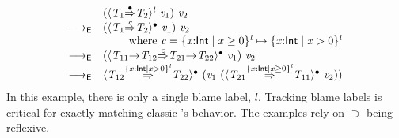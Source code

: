 \documentclass[9pt]{extarticle}
\newcommand{\ottnt}[1]{\mathit{#1}}
\newcommand{\ottsym}[1]{#1}
\begin{document}
\[ \begin{array}{rl} 
           &   (  \langle  \ottnt{T_{{\mathrm{1}}}}  \mathord{ \overset{\bullet}{\Rightarrow} }  \ottnt{T_{{\mathrm{2}}}}  \rangle^{ \ottnt{l} } ~  \mathit{v_{{\mathrm{1}}}}  )  ~ \mathit{v_{{\mathrm{2}}}}  \\
   \longrightarrow _{  \mathsf{E}  }  &   (  \langle  \ottnt{T_{{\mathrm{1}}}}  \mathord{ \overset{ \ottnt{c} }{\Rightarrow} }  \ottnt{T_{{\mathrm{2}}}}  \rangle^{\bullet} ~  \mathit{v_{{\mathrm{1}}}}  )  ~ \mathit{v_{{\mathrm{2}}}}  \\
  \multicolumn{2}{r}{\text{where } \ottnt{c}  \ottsym{=}   \{ \mathit{x} \mathord{:}  \mathsf{Int}  \mathrel{\mid}  \mathit{x}  \mathrel{\ge}  \ottsym{0}  \}^{ \ottnt{l} }   \mapsto   \{ \mathit{x} \mathord{:}  \mathsf{Int}  \mathrel{\mid}  \mathit{x}  \mathrel{>} \ottsym{0}  \}^{ \ottnt{l} } } \\
   \longrightarrow _{  \mathsf{E}  }  &   (  \langle   \ottnt{T_{{\mathrm{11}}}} \mathord{ \rightarrow } \ottnt{T_{{\mathrm{12}}}}   \mathord{ \overset{ \ottnt{c} }{\Rightarrow} }   \ottnt{T_{{\mathrm{21}}}} \mathord{ \rightarrow } \ottnt{T_{{\mathrm{22}}}}   \rangle^{\bullet} ~  \mathit{v_{{\mathrm{1}}}}  )  ~ \mathit{v_{{\mathrm{2}}}}  \\ 
   \longrightarrow _{  \mathsf{E}  }  &  \langle  \ottnt{T_{{\mathrm{12}}}}  \mathord{ \overset{  \{ \mathit{x} \mathord{:}  \mathsf{Int}  \mathrel{\mid}  \mathit{x}  \mathrel{>} \ottsym{0}  \}^{ \ottnt{l} }  }{\Rightarrow} }  \ottnt{T_{{\mathrm{22}}}}  \rangle^{\bullet} ~   (  \mathit{v_{{\mathrm{1}}}} ~  (  \langle  \ottnt{T_{{\mathrm{21}}}}  \mathord{ \overset{  \{ \mathit{x} \mathord{:}  \mathsf{Int}  \mathrel{\mid}  \mathit{x}  \mathrel{\ge}  \ottsym{0}  \}^{ \ottnt{l} }  }{\Rightarrow} }  \ottnt{T_{{\mathrm{11}}}}  \rangle^{\bullet} ~  \mathit{v_{{\mathrm{2}}}}  )   )  
\end{array} \]
In this example, there is only a single blame label, $\ottnt{l}$. Tracking
blame labels is critical for exactly matching classic \lambdah's
behavior. The examples rely on $ \supset $ being reflexive.
\end{document}
